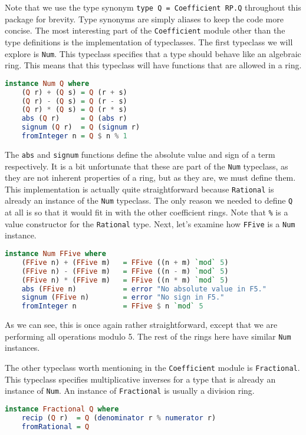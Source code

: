 \documentclass[MS, xcolor=dvipsnames]{wfuthesis}
\theoremstyle{definition}
\begin{document}
Note that we use the type synonym \lstinline{type Q = Coefficient RP.Q} throughout this package for brevity. Type synonyms are simply aliases to keep the code more concise. The most interesting part of the \lstinline{Coefficient} module other than the type definitions is the implementation of typeclasses. The first typeclass we will explore is \lstinline{Num}. This typeclass specifies that a type should behave like an algebraic ring. This means that this typeclass will have functions that are allowed in a ring.
\begin{lstlisting}[language=Haskell]
instance Num Q where
    (Q r) + (Q s) = Q (r + s)
    (Q r) - (Q s) = Q (r - s)
    (Q r) * (Q s) = Q (r * s)
    abs (Q r)     = Q (abs r)
    signum (Q r)  = Q (signum r)
    fromInteger n = Q $ n % 1
\end{lstlisting}
The \lstinline{abs} and \lstinline{signum} functions define the absolute value and sign of a term respectively. It is a bit unfortunate that these are part of the \lstinline{Num} typeclass, as they are not inherent properties of a ring, but as they are, we must define them. This implementation is actually quite straightforward because \lstinline{Rational} is already an instance of the \lstinline{Num} typeclass. The only reason we needed to define \lstinline{Q} at all is so that it would fit in with the other coefficient rings. Note that \lstinline{%} is a value constructor for the \lstinline{Rational} type. Next, let's examine how \lstinline{FFive} is a \lstinline{Num} instance.
\begin{lstlisting}[language=Haskell]
instance Num FFive where
    (FFive n) + (FFive m)   = FFive ((n + m) `mod` 5)
    (FFive n) - (FFive m)   = FFive ((n - m) `mod` 5)
    (FFive n) * (FFive m)   = FFive ((n * m) `mod` 5)
    abs (FFive n)           = error "No absolute value in F5."
    signum (FFive n)        = error "No sign in F5."
    fromInteger n           = FFive $ n `mod` 5
\end{lstlisting}
As we can see, this is once again rather straightforward, except that we are performing all operations modulo 5. The rest of the rings here have similar \lstinline{Num} instances. \par
The other typeclass worth mentioning in the \lstinline{Coefficient} module is \lstinline{Fractional}. This typeclass specifies multiplicative inverses for a type that is already an instance of \lstinline{Num}. An instance of \lstinline{Fractional} is usually a division ring.
\begin{lstlisting}[language=Haskell]
instance Fractional Q where
    recip (Q r)  = Q (denominator r % numerator r)
    fromRational = Q
\end{lstlisting}
\end{document}
